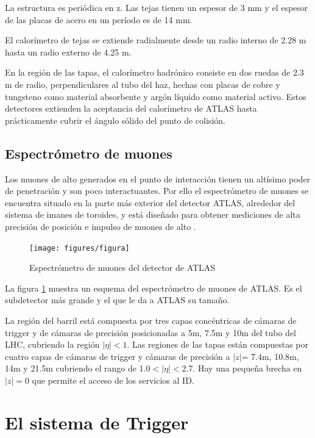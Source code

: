 La estructura es periódica en z. Las tejas tienen un espesor de 3 mm y el
espesor de las placas de acero en un período es de 14 mm.

El calorímetro de tejas se extiende radialmente desde un radio interno de 2.28 m
hasta un radio externo de 4.25 m.

En la región de las tapas, el calorímetro hadrónico consiste en dos ruedas de
2.3 m de radio, perpendiculares al tubo del haz, hechas con placas de cobre y
tungsteno como material absorbente y argón líquido como material activo. Estos
detectores extienden la aceptancia del calorímetro de ATLAS hasta prácticamente
cubrir el ángulo sólido del punto de colisión.


\subsection{Espectrómetro de muones}
Los muones de alto {\pt} generados en el punto de interacción tienen un altísimo
poder de penetración y son poco interactuantes. Por ello el espectrómetro de
muones \cite{muonTDR} se encuentra situado en la parte más exterior del detector
ATLAS, alrededor del sistema de imanes de toroides, y está diseñado para obtener
mediciones de alta precisión de posición e impulso de muones de alto \pt.

\begin{figure}[H]
  \centering \texttt{[image: figures/figura]}
  \caption{Espectrómetro de muones del detector de ATLAS}\label{fig:especmuones}
\end{figure}

La figura \ref{fig:especmuones} muestra un esquema del espectrómetro de muones
de ATLAS. Es el subdetector más grande y el que le da a ATLAS su tamaño.

La región del barril está compuesta por tres capas concéntricas de cámaras de
trigger y de cámaras de precisión posicionadas a 5m, 7.5m y 10m del tubo del
LHC, cubriendo la región $|\eta|<1$. Las regiones de las tapas están compuestas
por cuatro capas de cámaras de trigger y cámaras de precisión a $|z|$= 7.4m,
10.8m, 14m y 21.5m cubriendo el rango de 1.0$<|\eta|<$2.7. Hay una pequeña
brecha en $|z|=0$ que permite el acceso de los servicios al ID.

\section{El sistema de Trigger}


